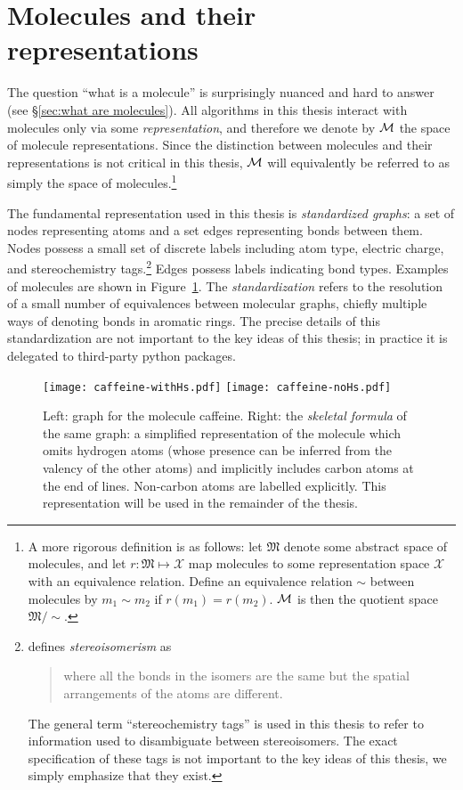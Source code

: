 \section{Molecules and their representations}
\label{sec:background:mols}

The question ``what is a molecule'' is surprisingly nuanced and hard to answer
(see \S\ref{sec:what are molecules}).
All algorithms in this thesis interact with molecules only via some \emph{representation},
and therefore we denote by $\mathcal{M}$ the space of molecule representations.
Since the distinction between molecules and their representations
is not critical in this thesis, $\mathcal{M}$ will equivalently be referred to as simply
the space of molecules.\footnote{
    A more rigorous definition is as follows:
    let $\mathfrak{M}$ denote some abstract space of molecules,
    and let $r:\mathfrak M\mapsto \mathcal X$ map molecules to some representation
    space $\mathcal X$ with an equivalence relation.
    Define an equivalence relation $\sim$ between molecules by $m_1\sim m_2$ if
    $r(m_1)=r(m_2)$.
    $\mathcal{M}$ is then the quotient space $\mathfrak M / \sim$.
}

The fundamental representation used in this thesis is
\emph{standardized graphs}:
a set of nodes representing atoms and a set edges representing bonds between them.
Nodes possess a small set of discrete labels including atom type, electric charge,
and stereochemistry tags.\footnote{
    \citet[page~960]{zumdahl2006chemistry}
    defines \emph{stereoisomerism} as
    \begin{quote}
        where all the bonds in the isomers are the same but the spatial arrangements of the atoms are different.
    \end{quote}
    The general term ``stereochemistry tags'' is used in this thesis to refer to information
    used to disambiguate between stereoisomers.
    The exact specification of these tags is not important to the key ideas of this thesis,
    we simply emphasize that they exist.
}
Edges possess labels indicating bond types.
Examples of molecules are shown in Figure~\ref{fig:background-example-molecules}.
The \emph{standardization} refers to the resolution of a small number of equivalences between molecular graphs,
chiefly multiple ways of denoting bonds in aromatic rings.
The precise details of this standardization are not important to the key ideas of this thesis;
in practice it is delegated to third-party python packages.

\begin{figure}
    \centering
    \texttt{[image: caffeine-withHs.pdf]}
    \texttt{[image: caffeine-noHs.pdf]}
    \caption[Graph of caffeine molecule.]{
        Left: graph for the molecule caffeine.
        Right: the \emph{skeletal formula} of the same graph:
        a simplified representation of the molecule which omits hydrogen atoms
        (whose presence can be inferred from the valency of the other atoms)
        and implicitly includes carbon atoms at the end of lines.
        Non-carbon atoms are labelled explicitly.
        This representation will be used in the remainder of the thesis.
    }
    \label{fig:background-example-molecules}
\end{figure}

